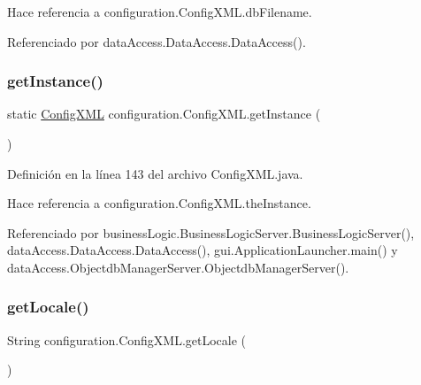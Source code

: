 Hace referencia a configuration.\+Config\+X\+M\+L.\+db\+Filename.



Referenciado por data\+Access.\+Data\+Access.\+Data\+Access().

\mbox{\label{classconfiguration_1_1_config_x_m_l_a74c5e0c09c0139554ede8d786cb808ff}} 
\subsubsection{\texorpdfstring{getInstance()}{getInstance()}}
{\footnotesize\ttfamily static \mbox{\hyperlink{classconfiguration_1_1_config_x_m_l}{Config\+X\+ML}} configuration.\+Config\+X\+M\+L.\+get\+Instance (\begin{DoxyParamCaption}{ }\end{DoxyParamCaption})\hspace{0.3cm}{\ttfamily [static]}}



Definición en la línea 143 del archivo Config\+X\+M\+L.\+java.


\begin{DoxyCode}{0}

\end{DoxyCode}


Hace referencia a configuration.\+Config\+X\+M\+L.\+the\+Instance.



Referenciado por business\+Logic.\+Business\+Logic\+Server.\+Business\+Logic\+Server(), data\+Access.\+Data\+Access.\+Data\+Access(), gui.\+Application\+Launcher.\+main() y data\+Access.\+Objectdb\+Manager\+Server.\+Objectdb\+Manager\+Server().

\mbox{\label{classconfiguration_1_1_config_x_m_l_a6b861b18eba822ef3a5130a1c3f410b2}} 
\subsubsection{\texorpdfstring{getLocale()}{getLocale()}}
{\footnotesize\ttfamily String configuration.\+Config\+X\+M\+L.\+get\+Locale (\begin{DoxyParamCaption}{ }\end{DoxyParamCaption})}



